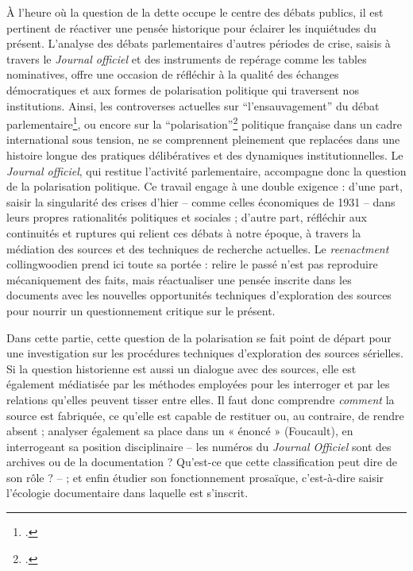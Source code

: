 À l’heure où la question de la dette occupe le centre des débats publics, il est pertinent de réactiver une pensée historique pour éclairer les inquiétudes du présent. L’analyse des débats parlementaires d’autres périodes de crise, saisis à travers le \emph{Journal officiel} et des instruments de repérage comme les tables nominatives, offre une occasion de réfléchir à la qualité des échanges démocratiques et aux formes de polarisation politique qui traversent nos institutions. Ainsi, les controverses actuelles sur \enquote{l’ensauvagement} du débat parlementaire\footcite[][]{ensauvagement}, ou encore sur la \enquote{polarisation}\footcite[][]{polarisation} politique française dans un cadre international sous tension, ne se comprennent pleinement que replacées dans une histoire longue des pratiques délibératives et des dynamiques institutionnelles. Le \emph{Journal officiel}, qui restitue l'activité parlementaire, accompagne donc la question de la polarisation politique. Ce travail engage à une double exigence : d’une part, saisir la singularité des crises d’hier -- comme celles économiques de 1931 -- dans leurs propres rationalités politiques et sociales ; d’autre part, réfléchir aux continuités et ruptures qui relient ces débats à notre époque, à travers la médiation des sources et des techniques de recherche actuelles. Le \emph{reenactment} collingwoodien prend ici toute sa portée : relire le passé n’est pas reproduire mécaniquement des faits, mais réactualiser une pensée inscrite dans les documents avec les nouvelles opportunités techniques d'exploration des sources pour nourrir un questionnement critique sur le présent.

Dans cette partie, cette question de la polarisation se fait point de départ pour une investigation sur les procédures techniques d’exploration des sources sérielles. Si la question historienne est aussi un dialogue avec des sources, elle est également médiatisée par les méthodes employées pour les interroger et par les relations qu’elles peuvent tisser entre elles. Il faut donc comprendre \emph{comment} la source est fabriquée, ce qu’elle est capable de restituer ou, au contraire, de rendre absent ; analyser également sa place dans un « énoncé » (Foucault), en interrogeant sa position disciplinaire -- les numéros du \emph{Journal Officiel} sont des archives ou de la documentation ? Qu'est-ce que cette classification peut dire de son rôle ? -- ; et enfin étudier son fonctionnement prosaïque, c’est-à-dire saisir l’écologie documentaire dans laquelle est s'inscrit.

